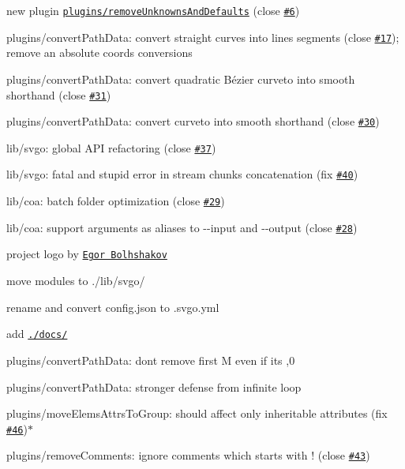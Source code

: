 \begin{DoxyItemize}
\item new plugin \href{https://github.com/svg/svgo/blob/master/plugins/removeUnknownsAndDefaults.js}{\tt plugins/remove\+Unknowns\+And\+Defaults} (close \href{https://github.com/svg/svgo/issues/6}{\tt \#6})
\item plugins/convert\+Path\+Data\+: convert straight curves into lines segments (close \href{https://github.com/svg/svgo/issues/17}{\tt \#17}); remove an absolute coords conversions
\item plugins/convert\+Path\+Data\+: convert quadratic Bézier curveto into smooth shorthand (close \href{https://github.com/svg/svgo/issues/31}{\tt \#31})
\item plugins/convert\+Path\+Data\+: convert curveto into smooth shorthand (close \href{https://github.com/svg/svgo/issues/30}{\tt \#30})
\item lib/svgo\+: global A\+PI refactoring (close \href{https://github.com/svg/svgo/issues/37}{\tt \#37})
\item lib/svgo\+: fatal and stupid error in stream chunks concatenation (fix \href{https://github.com/svg/svgo/issues/40}{\tt \#40})
\item lib/coa\+: batch folder optimization (close \href{https://github.com/svg/svgo/issues/29}{\tt \#29})
\item lib/coa\+: support arguments as aliases to {\ttfamily -\/-\/input} and {\ttfamily -\/-\/output} (close \href{https://github.com/svg/svgo/issues/28}{\tt \#28})
\item project logo by \href{http://xizzzy.ru/}{\tt Egor Bolhshakov}
\item move modules to {\ttfamily ./lib/svgo/}
\item rename and convert {\ttfamily config.\+json} to {\ttfamily .svgo.\+yml}
\item add \href{https://github.com/svg/svgo/tree/master/docs}{\tt ./docs/}
\item plugins/convert\+Path\+Data\+: don\textquotesingle{}t remove first {\ttfamily M} even if it\textquotesingle{}s {,0}
\item plugins/convert\+Path\+Data\+: stronger defense from infinite loop
\item plugins/move\+Elems\+Attrs\+To\+Group\+: should affect only inheritable attributes (fix \href{https://github.com/svg/svgo/issues/46}{\tt \#46})$\ast$
\item plugins/remove\+Comments\+: ignore comments which starts with \textquotesingle{}!\textquotesingle{} (close \href{https://github.com/svg/svgo/issues/43}{\tt \#43})

\end{DoxyItemize}
